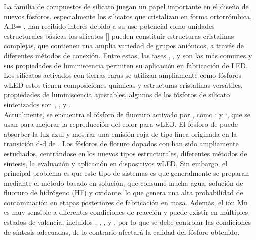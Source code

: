 La familia de compuestos de silicato juegan un papel importante en el diseño de 
nuevos fósforos, especialmente los silicatos que cristalizan en forma ortorrómbica,
 A,B= , han recibido interés debido a su uso
potencial como unidades estructurales básicas los silicatos [] 
pueden constituir estructuras cristalinas
complejas, que contienen una amplia variedad de grupos aniónicos, a través de
diferentes métodos de conexión. Entre estas, las fases ,
,  y  
son las más comunes y sus propiedades de luminiscencia permiten su aplicación en fabricación de LED. 
Los silicatos activados con tierras raras se utilizan ampliamente como fósforos
wLED estos tienen composiciones químicas y estructuras cristalinas versátiles,
propiedades de luminiscencia ajustables, algunos de los fósforos de silicato
sintetizados son , , 
 y \cite{Wu2018}.\\


Actualmente, se encuentra el fósforo de fluoruro activado por , 
como : y
:, que se usan para mejorar la reproducción del color
para wLED. El fósforo de  puede absorber la
luz azul y mostrar una emisión roja de tipo línea originada en la transición d-d
de . Los fósforos de floruro dopados con  han sido 
ampliamente estudiados, centrándose en los nuevos tipos estructurales, diferentes
métodos de síntesis, la evaluación y aplicación en dispositivos wLED. Sin embargo,
el principal problema es que este tipo de sistemas es que generalmente se preparan
mediante el método basado en solución, que consume mucha agua, solución de fluoruro
de hidrógeno (HF) y oxidante, lo que genera una alta probabilidad de contaminación 
en etapas posteriores de fabricación en masa. Además, el ión Mn es muy sensible 
a diferentes condiciones de reacción y puede existir en múltiples estados de valencia,
incluidos , , ,  y , 
por lo que se debe controlar las condiciones de síntesis adecuadas, de lo contrario 
afectará la calidad del fósforo obtenido\cite{Wu2018}.\\

